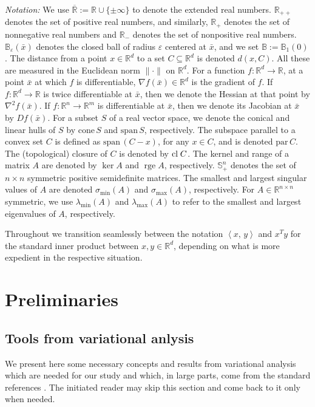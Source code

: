\documentclass[reqno]{amsart}
\numberwithin{equation}{section}
\newcommand{\R}{\mathbb{R}}
\newcommand{\x}{\bar{x}}
\newcommand{\ip}[2]{\left\langle #1,\, #2\right\rangle}
\newcommand{\para}{\mathrm{par}\,}
\newcommand{\lin}{\mathrm{span}\,}
\newcommand{\cone}{\mathrm{cone}\,}
\newcommand{\rge}{\operatorname{rge}}
\begin{document}
\noindent
{\em Notation:} We use $\overline{\R}:=\R\cup\{\pm\infty\}$ to denote the extended real numbers. $\R_{++}$ denotes the set of positive real numbers, and similarly, $\R_{+}$ denotes the set of nonnegative real numbers and $\R_{-}$ denotes the set of nonpositive real numbers.  $\mathbb{B}_{\varepsilon}(\x)$ denotes the closed ball of radius $\varepsilon$ centered at $\x$, and we set  $\mathbb{B}:=\mathbb B_1(0)$. The distance from a point $x \in \R^d$ to a set $C \subseteq \R^d$ is denoted $d(x, C)$. All these are measured in the Euclidean norm $\|\cdot\|$ on $\R^d$.  For a function $f : \R^d \to \R$, at a point $\x$ at which $f$ is differentiable, $\nabla f(\x) \in \R^d$ is the gradient of $f$. If $f : \R^d \to \R$ is twice differentiable at $\x$, then we denote the Hessian at that point by $\nabla^2 f(\x)$. If $f : \R^n \to \R^m$ is differentiable at $\x$, then we denote its Jacobian at $\x$ by $Df(\x)$. For a subset $S$ of a real vector space, we denote the conical and linear hulls of $S$ by $\cone S$ and $\lin S$, respectively. The subspace parallel to a convex set $C$ is defined as $\lin (C - x)$, for any $x \in C$, and is denoted $\para C$. The (topological) closure of $C$ is denoted by ${\rm cl\;}C$.  The kernel and range of a matrix $A$ are denoted by $\ker A$ and $\rge A$, respectively. $\mathbb{S}^n_{+}$ denotes the set of $n \times n$ symmetric positive semidefinite matrices.  The smallest and largest singular values of $A$ are denoted $\sigma_{\min}(A)$ and $\sigma_{\max}(A)$, respectively.  For $A \in \R^{n \times n}$ symmetric, we use $\lambda_{\min}(A)$ and $\lambda_{\max}(A)$ to refer to the smallest and largest eigenvalues of $A$, respectively. 

Throughout we transition seamlessly between the notation  $\ip{x}{y}$ and $x^Ty$ for the  standard inner product between  $x,y\in \R^d$,  depending on what is more expedient in the respective situation. 


\section{Preliminaries}\label{sec:Prelim}

\subsection{Tools from variational anlysis}
We present here some necessary concepts and results from variational analysis  which are needed for our study and which, in large parts,  come from the standard references \cite{DoR 14, RoW 98}. The initiated reader may skip this section and come back to it only when needed.
\end{document}

